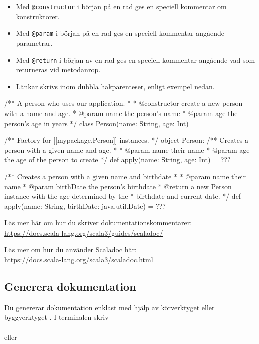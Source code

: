 \begin{itemize}
\item Med \verb|@constructor| i början på en rad ges en speciell kommentar om konstruktorer. 
\item Med \verb|@param| i början på en rad ges en speciell kommentar angående parametrar. 
\item Med \verb|@return| i början av en rad ges en speciell kommentar angående vad som returneras vid metodanrop.
\item Länkar skrivs inom dubbla hakparenteser, enligt exempel nedan.
\end{itemize}

\begin{Code}
/** A person who uses our application.
 *
 *  @constructor create a new person with a name and age.
 *  @param name the person's name
 *  @param age the person's age in years
 */
class Person(name: String, age: Int)  

/** Factory for [[mypackage.Person]] instances. */
object Person:
  /** Creates a person with a given name and age.
   *
   *  @param name their name
   *  @param age the age of the person to create
   */
  def apply(name: String, age: Int) = ???

  /** Creates a person with a given name and birthdate
   *
   *  @param name their name
   *  @param birthDate the person's birthdate
   *  @return a new Person instance with the age determined by the
   *          birthdate and current date.
   */
  def apply(name: String, birthDate: java.util.Date) = ???

\end{Code}


Läs mer här om hur du skriver dokumentationskommentarer: \\
\url{https://docs.scala-lang.org/scala3/guides/scaladoc/}

Läs mer om hur du använder Scaladoc här:\\
\url{https://docs.scala-lang.org/scala3/scaladoc.html}


\subsection{Generera dokumentation}


Du genererar dokumentation enklast med hjälp av körverktyget  eller byggverktyget . 
I terminalen skriv \\ \\eller \\

